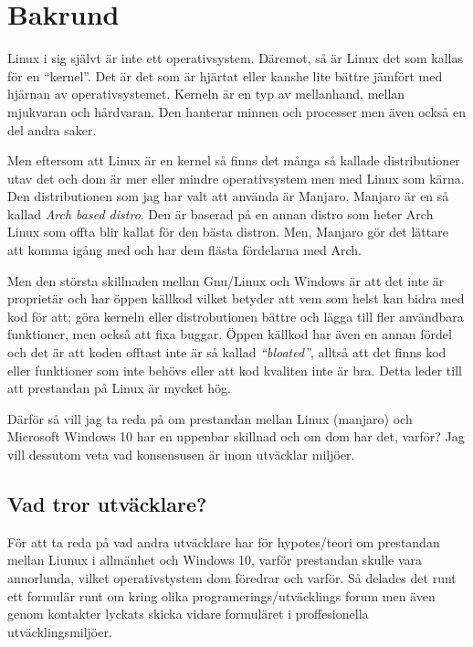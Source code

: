 \documentclass[a4paper, 12pt]{report}
\begin{document}
\section{Bakrund}

    Linux i sig självt är inte ett operativsystem. Däremot, så är Linux det som kallas för en ``kernel''\cite{redhat}. Det är det som är hjärtat eller kanshe lite bättre jämfört med hjärnan av operativsystemet. Kerneln är en typ av mellanhand, mellan mjukvaran och hårdvaran. Den hanterar minnen och processer men även också en del andra saker.

    Men eftersom att Linux är en kernel så finns det många så kallade distributioner utav det och dom är mer eller mindre operativsystem men med Linux som kärna. Den distributionen som jag har valt att använda är Manjaro\cite{manjaro}. Manjaro är en så kallad \textit{Arch based distro}. Den är baserad på en annan distro som heter Arch Linux som offta blir kallat för den bästa distron. Men, Manjaro gör det lättare att komma igång med och har dem flästa fördelarna med Arch.

    Men den största skillnaden mellan Gnu/Linux och Windows är att det inte är proprietär och har öppen källkod vilket betyder att vem som helst kan bidra med kod för att; göra kerneln eller distrobutionen bättre och lägga till fler användbara funktioner, men också att fixa buggar. Öppen källkod har även en annan fördel och det är att koden offtast inte är så kallad \textit{``bloated''}, alltså att det finns kod eller funktioner som inte behövs eller att kod kvaliten inte är bra. Detta leder till att prestandan på Linux är mycket hög. 
    
    Därför så vill jag ta reda på om prestandan mellan Linux (manjaro) och Microsoft Windows 10 har en uppenbar skillnad och om dom har det, varför? Jag vill dessutom veta vad konsensusen är inom utväcklar miljöer.

\subsection{Vad tror utväcklare?}

    För att ta reda på vad andra utväcklare har för hypotes/teori om prestandan mellan Liunux i allmänhet och Windows 10, varför prestandan skulle vara annorlunda, vilket operativstystem dom föredrar och varför.  Så delades det runt ett formulär runt om kring olika programerings/utväcklings forum men även genom kontakter lyckats skicka vidare formuläret i proffesionella utväcklingsmiljöer.
\end{document}
